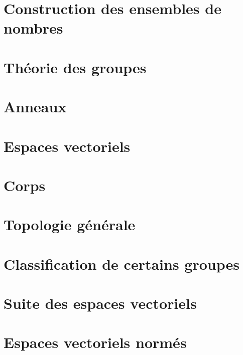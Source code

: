 \documentclass[a4paper,twoside,11pt]{book}
\begin{document}
\emptyInputPath
{}




\chapter{Construction des ensembles de nombres}


\chapter{Théorie des groupes}



\chapter{Anneaux}



\chapter{Espaces vectoriels}


\chapter{Corps}





\chapter{Topologie générale}




\chapter{Classification de certains groupes}


\chapter{Suite des espaces vectoriels}








\chapter{Espaces vectoriels normés}


\end{document}
